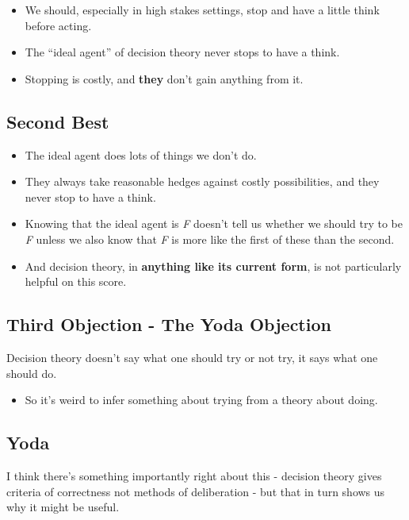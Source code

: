 \documentclass[
  letterpaper,
  DIV=11,
  numbers=noendperiod]{scrartcl}
\providecommand{\tightlist}{%
  \setlength{\itemsep}{0pt}\setlength{\parskip}{0pt}}\usepackage{longtable,booktabs,array}
\begin{document}
\begin{itemize}
\tightlist
\item
  We should, especially in high stakes settings, stop and have a little
  think before acting.
\item
  The ``ideal agent'' of decision theory never stops to have a think.
\item
  Stopping is costly, and \textbf{they} don't gain anything from it.
\end{itemize}

\subsection{Second Best}\label{second-best-1}

\begin{itemize}
\tightlist
\item
  The ideal agent does lots of things we don't do.
\item
  They always take reasonable hedges against costly possibilities, and
  they never stop to have a think.
\item
  Knowing that the ideal agent is \emph{F} doesn't tell us whether we
  should try to be \emph{F} unless we also know that \emph{F} is more
  like the first of these than the second.
\item
  And decision theory, in \textbf{anything like its current form}, is
  not particularly helpful on this score.
\end{itemize}

\subsection{Third Objection - The Yoda
Objection}\label{third-objection---the-yoda-objection}

Decision theory doesn't say what one should try or not try, it says what
one should do.

\begin{itemize}
\tightlist
\item
  So it's weird to infer something about trying from a theory about
  doing.
\end{itemize}

\subsection{Yoda}\label{yoda}

I think there's something importantly right about this - decision theory
gives criteria of correctness not methods of deliberation - but that in
turn shows us why it might be useful.
\end{document}
